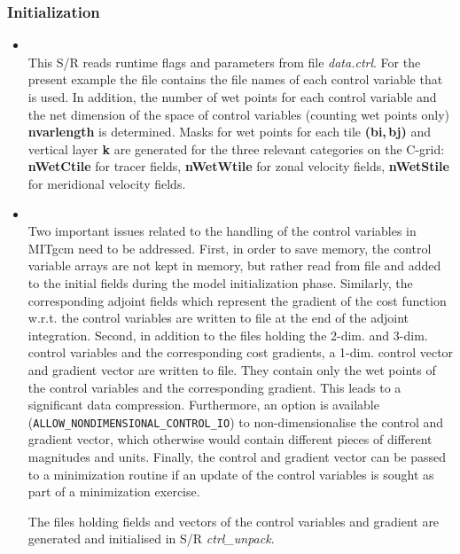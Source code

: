 \subsubsection{Initialization}
%
\begin{itemize}
%
\item 
{}
\\
%
This S/R 
reads runtime flags and parameters from file {\it data.ctrl}.
For the present example the file contains the file names
of each control variable that is used.
In addition, the number of wet points for each control
variable and the net dimension of the space of control
variables (counting wet points only) {\bf nvarlength}
is determined.
Masks for wet points for each tile {\bf (bi,\,bj)}
and vertical layer {\bf k} are generated for the three
relevant categories on the C-grid:
{\bf nWetCtile} for tracer fields, 
{\bf nWetWtile} for zonal velocity fields,
{\bf nWetStile} for meridional velocity fields.
%
\item 
{}
\\
%
Two important issues related to the handling of the control
variables in MITgcm need to be addressed.
First, in order to save memory, the control variable arrays
are not kept in memory, but rather read from file and added
to the initial fields during the model initialization phase.
Similarly, the corresponding adjoint fields which represent
the gradient of the cost function w.r.t. the control variables
are written to file at the end of the adjoint integration.
Second, in addition to the files holding the 2-dim. and 3-dim.
control variables and the corresponding cost gradients, 
a 1-dim. {\sf control vector} 
and {\sf gradient vector} are written to file. They contain 
only the wet points of the control variables and the corresponding 
gradient.
This leads to a significant data compression.
Furthermore, an option is available
({\tt ALLOW\_NONDIMENSIONAL\_CONTROL\_IO}) to
non-dimensionalise the control and gradient vector,
which otherwise would contain different pieces of different
magnitudes and units.
Finally, the control and gradient vector can be passed to a 
minimization routine if an update of the control variables
is sought as part of a minimization exercise.

The files holding fields and vectors of the control variables
and gradient are generated and initialised in S/R {\it ctrl\_unpack}.
%
\end{itemize}

